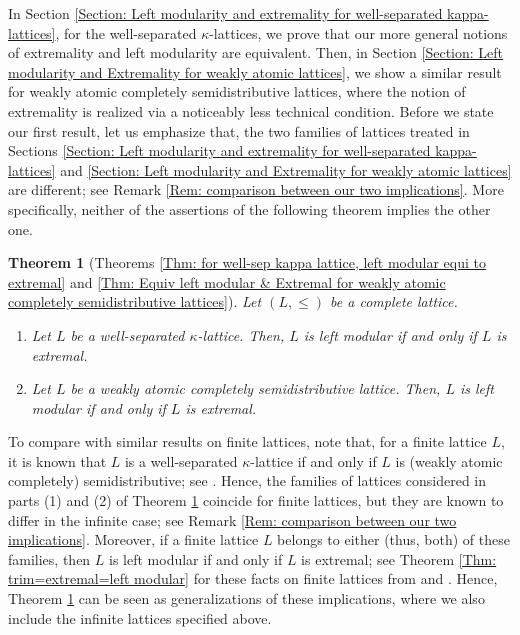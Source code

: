 \documentclass{amsart}
\theoremstyle{thmstyle}
\newtheorem{theorem}[thm]{Theorem}
\theoremstyle{exstyle}
\theoremstyle{defstyle}
\theoremstyle{remstyle}
\theoremstyle{remstyle}
\begin{document}
In Section \ref{Section: Left modularity and extremality for well-separated kappa-lattices}, for the well-separated $\kappa$-lattices, we prove that our more general notions of extremality and left modularity are equivalent. Then, in Section \ref{Section: Left modularity and Extremality for weakly atomic lattices}, we show a similar result for weakly atomic completely semidistributive lattices, where the notion of extremality is realized via a noticeably less technical condition. 
Before we state our first result, let us emphasize that, the two families of lattices treated in Sections \ref{Section: Left modularity and extremality for well-separated kappa-lattices} and \ref{Section: Left modularity and Extremality for weakly atomic lattices} are different; see Remark \ref{Rem: comparison between our two implications}. 
More specifically, neither of the assertions of the following theorem implies the other one. 

\begin{theorem}[Theorems \ref{Thm: for well-sep kappa lattice, left modular equi to extremal} and \ref{Thm: Equiv left modular & Extremal for weakly atomic completely semidistributive lattices}] \label{Thm: Equivalences for infinite lattices}
Let $(L,\leq)$ be a complete lattice. 
\begin{enumerate}
    \item Let $L$ be a well-separated $\kappa$-lattice. Then, $L$ is left modular if and only if $L$ is extremal.
    \item Let $L$ be a weakly atomic completely semidistributive lattice. Then, $L$ is left modular if and only if $L$ is extremal.
\end{enumerate}
\end{theorem}

To compare with similar results on finite lattices, note that, for a finite lattice $L$, it is known that $L$ is a well-separated $\kappa$-lattice if and only if $L$ is (weakly atomic completely) semidistributive; see \cite[Theorem 3.1]{RST}. 
Hence, the families of lattices considered in parts (1) and (2) of Theorem \ref{Thm: Equivalences for infinite lattices} coincide for finite lattices, but they are known to differ in the infinite case; see Remark \ref{Rem: comparison between our two implications}. 
Moreover, if a finite lattice $L$ belongs to either (thus, both) of these families, then $L$ is left modular if and only if $L$ is extremal; see Theorem \ref{Thm: trim=extremal=left modular} for these facts on finite lattices from \cite[Theorem 1.4]{TW} and \cite[Corollary 3.4]{Mu}.
Hence, Theorem \ref{Thm: Equivalences for infinite lattices} can be seen as generalizations of these implications, where we also include the infinite lattices specified above. 
\end{document}
